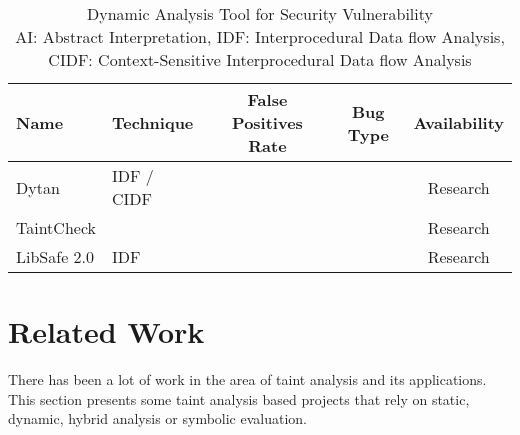 \begin{table*}[!htbp]
\centering
\begin{tabular}{|l|l|c|c|c|}
\hline
{\bf Name}		&  {\bf Technique }		&{\bf False Positives Rate}& {\bf Bug Type}	& {\bf Availability}\\ \hline \hline
Dytan	    	& 	IDF / CIDF			&					&					&	Research			\\ 
TaintCheck		& 						&					&					&	Research			\\ 
LibSafe $2.0$	& 	IDF					&					&					&	Research			\\ \hline
\end{tabular}\caption{Dynamic Analysis Tool for Security Vulnerability\\
AI: Abstract Interpretation, 
IDF: Interprocedural Data flow Analysis, 
CIDF: Context-Sensitive Interprocedural Data flow Analysis }
\end{table*}

\section{Related Work}\label{sec:related}

There has been a lot of work in the area of taint analysis
and its applications. This section presents some taint
analysis based projects that rely on static, dynamic,
hybrid analysis or symbolic evaluation.

